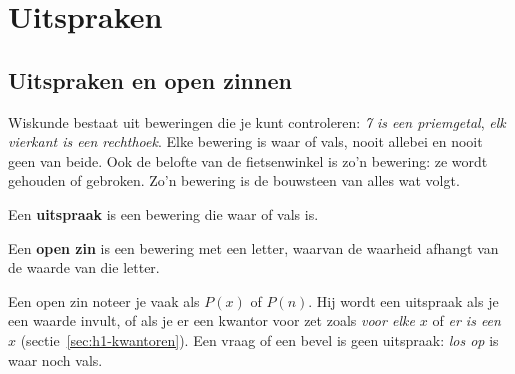 \begin{oefeningen}[Start]

\end{oefeningen}


\section{Uitspraken}\label{sec:h1-uitspraken}

\subsection{Uitspraken en open zinnen}

Wiskunde bestaat uit beweringen die je kunt controleren: \textit{7 is een priemgetal}, \textit{elk vierkant is een rechthoek}. Elke bewering is waar of vals, nooit allebei en nooit geen van beide. Ook de belofte van de fietsenwinkel is zo'n bewering: ze wordt gehouden of gebroken. Zo'n bewering is de bouwsteen van alles wat volgt.

\begin{theorie}
Een \textbf{\textcolor{accent}{uitspraak}} is een bewering die waar of vals is.

\vspace{1mm}
Een \textbf{\textcolor{accent}{open zin}} is een bewering met een letter, waarvan de waarheid afhangt van de waarde van die letter.
\end{theorie}

Een open zin noteer je vaak als $P(x)$ of $P(n)$. Hij wordt een uitspraak als je een waarde invult, of als je er een kwantor voor zet zoals \textit{voor elke $x$} of \textit{er is een $x$} (sectie~\ref{sec:h1-kwantoren}). Een vraag of een bevel is geen uitspraak: \textit{los op} is waar noch vals.



